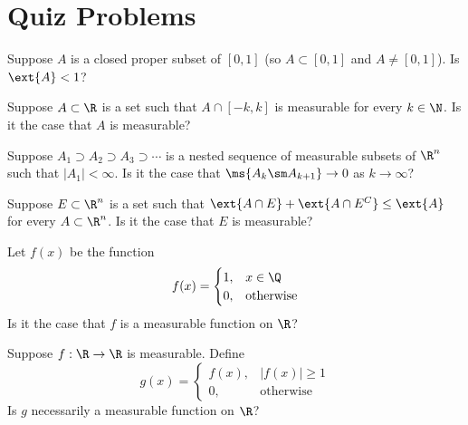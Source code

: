 \newpage
\section{Quiz Problems}

\begin{quiz}
Suppose $A$ is a closed proper subset of $[0,1]$ (so $A \subset [0,1]$ and $A \neq [0,1]$). Is $\ext{A}<1$?
\end{quiz}


\begin{quiz}
Suppose $A \subset \R$ is a set such that $A \cap [-k,k]$ is measurable for every $k \in \N$. Is it the case that $A$ is measurable? 
\end{quiz}





\begin{quiz}
Suppose $A_1 \supset A_2 \supset A_3 \supset \cdots$ is a nested sequence of measurable subsets of $\R^n$ such that $|A_1|<\infty$. Is it the case that $\ms{A_k \sm A_{k+1}} \to 0$ as $k \to \infty$?
\end{quiz}


\begin{quiz}
Suppose $E \subset \R^n$ is a set such that $\ext{A \cap E} + \ext{A \cap E^C} \leq \ext{A}$ for every $A \subset \R^n$. Is it the case that $E$ is measurable? 
\end{quiz}











\begin{quiz}
Let $f(x)$ be the function
	\[
	f(x)=
	\begin{cases}
	1, & x \in \Q \\
	0, & \text{otherwise}
	\end{cases}
	\]
Is it the case that $f$ is a measurable function on $\R$?
\end{quiz}


\begin{quiz}
Suppose $f: \R \to \R$ is measurable. Define
	\[
	g(x)=
	\begin{cases}
	f(x), & |f(x)| \geq 1 \\
	0, & \text{otherwise}
	\end{cases}
	\]
Is $g$ necessarily a measurable function on $\R$?
\end{quiz}



